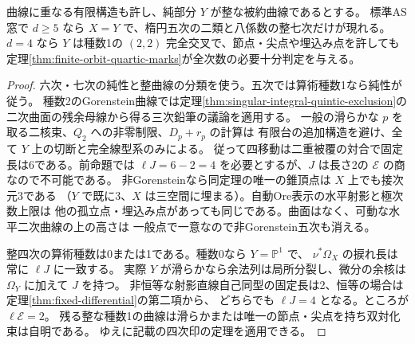 \begin{corollary}\label{cor:integral-hull-high-degrees}
曲線に重なる有限構造も許し、純部分 $Y$ が整な被約曲線であるとする。
標準AS窓で $d\ge5$ なら $X=Y$ で、楕円五次の二類と八係数の整七次だけが現れる。
$d=4$ なら $Y$ は種数1の $(2,2)$ 完全交叉で、節点・尖点や埋込み点を許しても
定理\ref{thm:finite-orbit-quartic-marks}が全次数の必要十分判定を与える。
\end{corollary}
\begin{proof}
六次・七次の純性と整曲線の分類を使う。五次では算術種数1なら純性が従う。
種数2のGorenstein曲線では定理\ref{thm:singular-integral-quintic-exclusion}の
二次曲面の残余母線から得る三次鉛筆の議論を適用する。
一般の滑らかな $p$ を取る二核束、$Q_2$ への非零制限、$D_p+r_p$ の計算は
有限台の追加構造を避け、全て $Y$ 上の切断と完全線型系のみによる。
従って四移動は二重被覆の対合で固定長は6である。前命題では
$\ell J=6-2=4$ を必要とするが、$J$ は長さ2の $\mathcal E$ の商なので不可能である。
非Gorensteinなら同定理の唯一の錐頂点は $X$ 上でも接次元3である
（$Y$ で既に3、$X$ は三空間に埋まる）。自動Ore表示の水平射影と極次数上限は
他の孤立点・埋込み点があっても同じである。曲面はなく、可動な水平二次曲線の上の高さは
一般点で一意なので非Gorenstein五次も消える。

整四次の算術種数は0または1である。種数0なら $Y=\mathbb P^1$ で、
$\nu^*\Omega_X$ の捩れ長は常に $\ell J$ に一致する。
実際 $Y$ が滑らかなら余法列は局所分裂し、微分の余核は $\Omega_Y$ に加えて $J$ を持つ。
非恒等な射影直線自己同型の固定長は2、恒等の場合は定理\ref{thm:fixed-differential}の第二項から、
どちらでも $\ell J=4$ となる。ところが $\ell\mathcal E=2$。
残る整な種数1の曲線は滑らかまたは唯一の節点・尖点を持ち双対化束は自明である。
ゆえに記載の四次印の定理を適用できる。
\end{proof}

